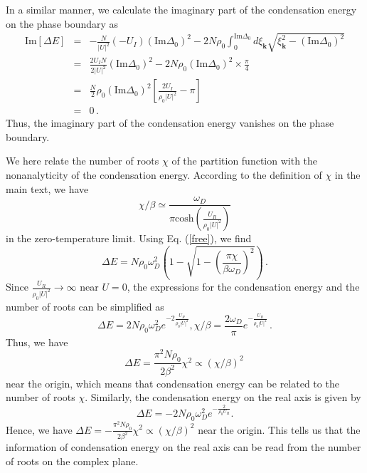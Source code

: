 \documentclass[aps,onecolumn,superscriptaddress,notitlepage,longbibliography]{revtex4-1}
\begin{document}
In a similar manner, we calculate the imaginary part of the condensation energy on the phase boundary as
\begin{eqnarray}
  \text{Im} [\Delta E] & = & - \frac{N}{| U |^2} \left( - U_I \right)
  \left( \text{Im} \Delta_0 \right)^2 - 2 N \rho_0 \int_0^{\text{Im} \Delta_0}
  d \xi_{\bm{k}} \sqrt{\xi_{\bm{k}}^2 - \left(\text{Im} \Delta_0\right)^2} \nonumber\\
  & = & \frac{2U_I N}{2 | U |^2} \left( \text{Im} \Delta_0 \right)^2 - 2 N
  \rho_0 \left( \text{Im} \Delta_0 \right)^2 \times \frac{\pi}{4} \nonumber\\
  & = & \frac{N}{2} \rho_0 \left( \text{Im} \Delta_0 \right)^2 \left[
  \frac{2U_I}{\rho_0 | U |^2} - \pi \right] \nonumber\\
  & = & 0 \,.
\end{eqnarray}
Thus, the imaginary part of the condensation energy vanishes on the phase boundary. 

We here relate the number of roots $\chi$ of the partition function with the nonanalyticity of the condensation energy. According to the definition of $\chi$ in the main text, we have
\begin{equation}
    \chi / \beta \simeq\frac{\omega_D}{\pi\text{cosh}(\frac{U_R}{\rho_0|U|^2})}
\end{equation}
in the zero-temperature limit. Using Eq. (\ref{free}), we find
\begin{equation}
    \Delta E=N\rho_0\omega_D^2(1-\sqrt{1-(\frac{\pi\chi}{\beta\omega_D})^2})\,.
\end{equation}
Since $\frac{U_R}{\rho_0|U|^2}\rightarrow\infty$ near $U=0$, the expressions for the condensation energy and the number of roots can be simplified as
\begin{equation}
    \Delta E=2N \rho_0 \omega_D^2 e^{-2\frac{U_R}{\rho_0|U|^2}},\chi/\beta=\frac{2\omega_D}{\pi}e^{-\frac{U_R}{\rho_0|U|^2}}\,.
\end{equation}
Thus, we have
\begin{equation}
    \Delta E=\frac{\pi^2N\rho_0}{2\beta^2}\chi^2\propto(\chi/\beta)^2\,
\end{equation}
near the origin, which means that condensation energy can be related to the number of roots $\chi$. Similarly, the condensation energy on the real axis is given by
\begin{equation}
	\Delta E=-2N \rho_0 \omega_D^2 e^{-\frac{2}{\rho_0 U_R}}.
\end{equation}
Hence, we have $\Delta E=-\frac{\pi^2N\rho_0}{2\beta^2}\chi^2\propto(\chi/\beta)^2$ near the origin. This tells us that the information of condensation energy on the real axis can be read from the number of roots on the complex plane.
\end{document}
